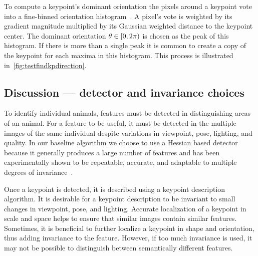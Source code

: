         To compute a keypoint's dominant orientation the pixels around a keypoint vote into a fine-binned
        orientation histogram~\cite{lowe_distinctive_2004}. A pixel's vote is weighted by its gradient magnitude
        multiplied by its Gaussian weighted distance to the keypoint center. The dominant orientation %
        $\theta \in [0,2\pi\rparen$ is chosen as the peak of this histogram. If there is more than a single peak
        it is common to create a copy of the keypoint for each maxima in this histogram. This process is
        illustrated in~\cref{fig:testfindkpdirection}.

        \testfindkpdirection{}

        \FloatBarrier{}

    \subsection{Discussion --- detector and invariance choices}
        To identify individual animals, features must be detected in distinguishing areas of an animal. For a
        feature to be useful, it must be detected in the multiple images of the same individual despite variations
        in viewpoint, pose, lighting, and quality. In our baseline algorithm we choose to use a Hessian based
        detector~\cite{perdoch_efficient_2009, lindeberg_feature_1998} because it generally produces a large number
        of features and has been experimentally shown to be repeatable, accurate, and adaptable to multiple degrees
        of invariance~\cite{tuytelaars_local_2007}.

        Once a keypoint is detected, it is described using a keypoint description algorithm. It is desirable for a
        keypoint description to be invariant to small changes in viewpoint, pose, and lighting. Accurate
        localization of a keypoint in scale and space helps to ensure that similar images contain similar features.
        Sometimes, it is beneficial to further localize a keypoint in shape and orientation, thus adding invariance
        to the feature. However, if too much invariance is used, it may not be possible to distinguish between
        semantically different features.

